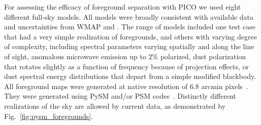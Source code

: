\documentclass[PICOReport.tex]{subfiles}
\begin{document}




For assessing the efficacy of foreground separation with PICO we used eight different full-sky models. All models were broadly consistent with available data and uncertainties from WMAP and \planck . The range of models included one test case that had a very simple realization of foregrounds, and others with varying degree of complexity, including spectral parameters varying spatially and along the line of sight, anomalous microwave emission up to 2\% polarized, dust polarization that rotates slightly as a function of frequency because of projection effects, or dust spectral energy distributions that depart from a simple modified blackbody. All foreground maps were generated at native resolution of 6.8 arcmin pixels~\citep{gorski/etal:2005}. They were generated using PySM and/or PSM codes~\citep{thorne2018_pysm,delabrouille/etal:2013}.   Distinctly different realizations of the sky are allowed by current data, as demonstrated by Fig.~\ref{fig:pysm_foregrounds}. 
\end{document}
